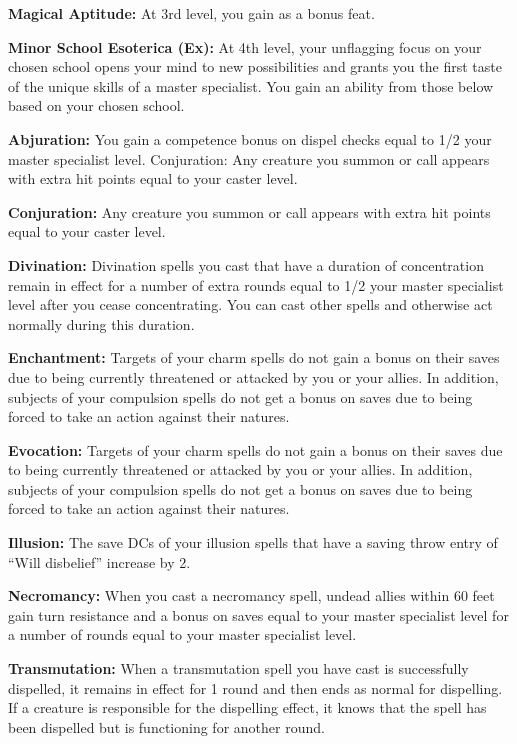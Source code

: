 \textbf{Magical Aptitude:} At 3rd level, you gain  as a bonus feat.

\textbf{Minor School Esoterica (Ex):} At 4th level, your unflagging focus on your chosen school opens your mind to new possibilities and grants you the first taste of the unique skills of a master specialist. You gain an ability from those below based on your chosen school.

\begin{itemize*}
\item \textbf{Abjuration:} You gain a competence bonus on dispel checks equal to 1/2 your master specialist level. Conjuration: Any creature you summon or call appears with extra hit points equal to your caster level.
\item \textbf{Conjuration:} Any creature you summon or call appears with extra hit points equal to your caster level.
\item \textbf{Divination:} Divination spells you cast that have a duration of concentration remain in effect for a number of extra rounds equal to 1/2 your master specialist level after you cease
concentrating. You can cast other spells and otherwise act normally during this duration.
\item \textbf{Enchantment:} Targets of your charm spells do not gain a bonus on their saves due to being currently threatened or attacked by you or your allies. In addition, subjects of your compulsion spells do not get a bonus on saves due to being forced to take an action against their natures.
\item \textbf{Evocation:} Targets of your charm spells do not gain a bonus on their saves due to being currently threatened or attacked by you or your allies. In addition, subjects of your compulsion spells do not get a bonus on saves due to being forced to take an action against their natures.
\item \textbf{Illusion:} The save DCs of your illusion spells that have a saving throw entry of “Will disbelief” increase by 2.
\item \textbf{Necromancy:} When you cast a necromancy spell, undead allies within 60 feet gain turn resistance and a bonus on saves equal to your master specialist level for a number of rounds equal to your master specialist level.
\item \textbf{Transmutation:} When a transmutation spell you have cast is successfully dispelled, it remains in effect for 1 round and then ends as normal for dispelling. If a creature is responsible for the dispelling effect, it knows that the spell has been dispelled but is functioning for another round.
\end{itemize*}

